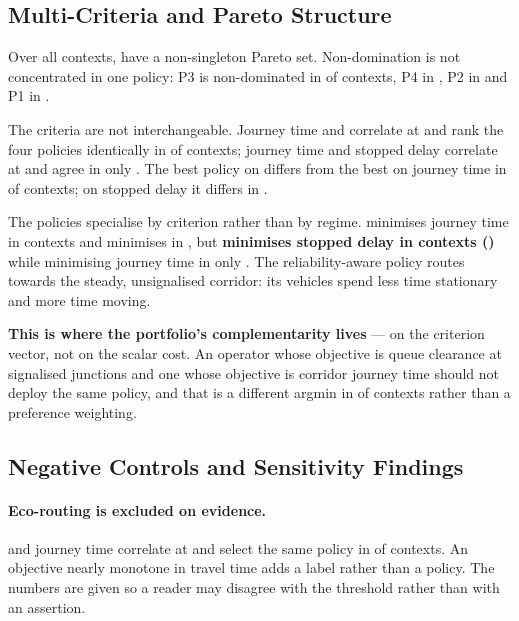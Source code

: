 \subsection{Multi-Criteria and Pareto Structure}
\label{sec:pareto}

Over all \NumContextsAnalysed{} contexts, \NumParetoNonSingleton{} have a
non-singleton Pareto set. Non-domination is not concentrated in one policy: P3
is non-dominated in \NumParetoPctPThree{} of contexts, P4 in
\NumParetoPctPFour{}, P2 in \NumParetoPctPTwo{} and P1 in \NumParetoPctPOne{}.

The criteria are not interchangeable. Journey time and \CO{} correlate at
\NumCorrCOneCTwo{} and rank the four policies identically in
\NumSameOrderCOneCTwo{} of contexts; journey time and stopped delay correlate at
\NumCorrCOneCThree{} and agree in only \NumSameOrderCOneCThree{}. The best
policy on \CO{} differs from the best on journey time in
\NumBestCTwoDiffersPct{} of contexts; on stopped delay it differs in
\NumBestCThreeDiffersPct{}.

The policies specialise by criterion rather than by regime.
\NumSpecCOnePolicy{} minimises journey time in \NumSpecCOneN{} contexts and
\NumSpecCTwoPolicy{} minimises \CO{} in \NumSpecCTwoN{}, but
\textbf{\NumSpecCThreePolicy{} minimises stopped delay in \NumSpecCThreeN{}
contexts (\NumSpecCThreePct{})} while minimising journey time in only
\NumSpecCOnePFour{}. The reliability-aware policy routes towards the steady,
unsignalised corridor: its vehicles spend less time stationary and more time
moving.

\textbf{This is where the portfolio's complementarity lives} --- on the criterion
vector, not on the scalar cost. An operator whose objective is queue clearance
at signalised junctions and one whose objective is corridor journey time should
not deploy the same policy, and that is a different argmin in
\NumBestCThreeDiffersPct{} of contexts rather than a preference weighting.

\subsection{Negative Controls and Sensitivity Findings}

\paragraph{Eco-routing is excluded on evidence.} \CO{} and journey time
correlate at \NumCorrCOneCTwo{} and select the same policy in
\NumSameOrderCOneCTwo{} of contexts. An objective nearly monotone in travel time
adds a label rather than a policy. The numbers are given so a reader may
disagree with the threshold rather than with an assertion.

